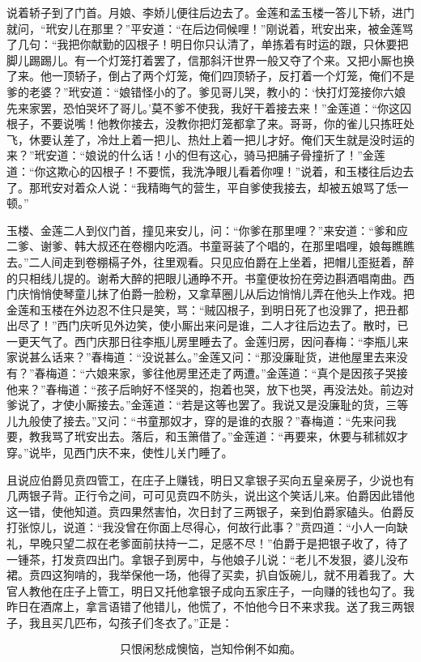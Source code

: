 说着轿子到了门首。月娘、李娇儿便往后边去了。金莲和孟玉楼一答儿下轿，进门就问，“玳安儿在那里？”平安道：“在后边伺候哩！”刚说着，玳安出来，被金莲骂了几句：“我把你献勤的囚根子！明日你只认清了，单拣着有时运的跟，只休要把脚儿踢踢儿。有一个灯笼打着罢了，信那斜汗世界一般又夺了个来。又把小厮也换了来。他一顶轿子，倒占了两个灯笼，俺们四顶轿子，反打着一个灯笼，俺们不是爹的老婆？”玳安道：“娘错怪小的了。爹见哥儿哭，教小的：‘快打灯笼接你六娘先来家罢，恐怕哭坏了哥儿。’莫不爹不使我，我好干着接去来！”金莲道：“你这囚根子，不要说嘴！他教你接去，没教你把灯笼都拿了来。哥哥，你的雀儿只拣旺处飞，休要认差了，冷灶上着一把儿、热灶上着一把儿才好。俺们天生就是没时运的来？”玳安道：“娘说的什么话！小的但有这心，骑马把脯子骨撞折了！”金莲道：“你这欺心的囚根子！不要慌，我洗净眼儿看着你哩！”说着，和玉楼往后边去了。那玳安对着众人说：“我精晦气的营生，平自爹使我接去，却被五娘骂了恁一顿。”

玉楼、金莲二人到仪门首，撞见来安儿，问：“你爹在那里哩？”来安道：“爹和应二爹、谢爹、韩大叔还在卷棚内吃酒。书童哥装了个唱的，在那里唱哩，娘每瞧瞧去。”二人间走到卷棚槅子外，往里观看。只见应伯爵在上坐着，把帽儿歪挺着，醉的只相线儿提的。谢希大醉的把眼儿通睁不开。书童便妆扮在旁边斟酒唱南曲。西门庆悄悄使琴童儿抹了伯爵一脸粉，又拿草圈儿从后边悄悄儿弄在他头上作戏。把金莲和玉楼在外边忍不住只是笑，骂：“贼囚根子，到明日死了也没罪了，把丑都出尽了！”西门庆听见外边笑，使小厮出来问是谁，二人才往后边去了。散时，已一更天气了。西门庆那日往李瓶儿房里睡去了。金莲归房，因问春梅：“李瓶儿来家说甚么话来？”春梅道：“没说甚么。”金莲又问：“那没廉耻货，进他屋里去来没有？”春梅道：“六娘来家，爹往他房里还走了两遭。”金莲道：“真个是因孩子哭接他来？”春梅道：“孩子后晌好不怪哭的，抱着也哭，放下也哭，再没法处。前边对爹说了，才使小厮接去。”金莲道：“若是这等也罢了。我说又是没廉耻的货，三等儿九般使了接去。”又问：“书童那奴才，穿的是谁的衣服？”春梅道：“先来问我要，教我骂了玳安出去。落后，和玉箫借了。”金莲道：“再要来，休要与秫秫奴才穿。”说毕，见西门庆不来，使性儿关门睡了。

且说应伯爵见贲四管工，在庄子上赚钱，明日又拿银子买向五皇亲房子，少说也有几两银子背。正行令之间，可可见贲四不防头，说出这个笑话儿来。伯爵因此错他这一错，使他知道。贲四果然害怕，次日封了三两银子，亲到伯爵家磕头。伯爵反打张惊儿，说道：“我没曾在你面上尽得心，何故行此事？”贲四道：“小人一向缺礼，早晚只望二叔在老爹面前扶持一二，足感不尽！”伯爵于是把银子收了，待了一锺茶，打发贲四出门。拿银子到房中，与他娘子儿说：“老儿不发狠，婆儿没布裙。贲四这狗啃的，我举保他一场，他得了买卖，扒自饭碗儿，就不用着我了。大官人教他在庄子上管工，明日又托他拿银子成向五家庄子，一向赚的钱也勾了。我昨日在酒席上，拿言语错了他错儿，他慌了，不怕他今日不来求我。送了我三两银子，我且买几匹布，勾孩子们冬衣了。”正是：

\[
只恨闲愁成懊恼，岂知伶俐不如痴。
\]
